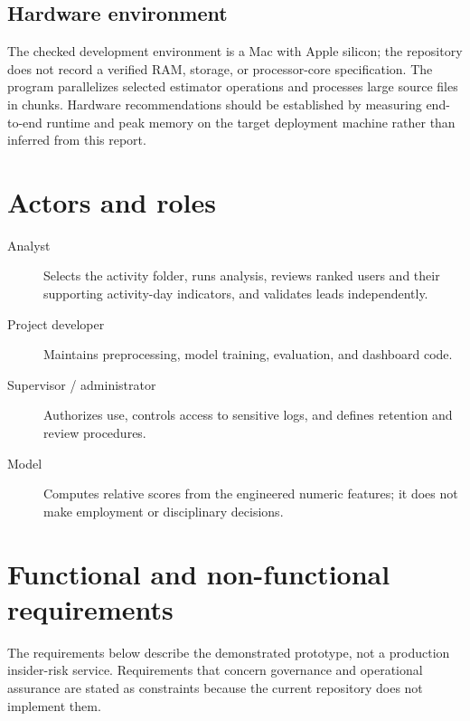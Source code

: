 \documentclass[12pt,a4paper,oneside]{report}
\begin{document}
\subsection{Hardware environment}
The checked development environment is a Mac with Apple silicon; the
repository does not record a verified RAM, storage, or processor-core
specification. The program parallelizes selected estimator operations
and processes large source files in chunks. Hardware recommendations
should be established by measuring end-to-end runtime and peak memory
on the target deployment machine rather than inferred from this report.

\section{Actors and roles}
\begin{description}
  \item[Analyst] Selects the activity folder, runs analysis, reviews
        ranked users and their supporting activity-day indicators, and
        validates leads independently.
  \item[Project developer] Maintains preprocessing, model training,
        evaluation, and dashboard code.
  \item[Supervisor / administrator] Authorizes use, controls access to
        sensitive logs, and defines retention and review procedures.
  \item[Model] Computes relative scores from the engineered numeric
        features; it does not make employment or disciplinary decisions.
\end{description}

\section{Functional and non-functional requirements}
The requirements below describe the demonstrated prototype, not a
production insider-risk service. Requirements that concern governance
and operational assurance are stated as constraints because the current
repository does not implement them.
\end{document}
